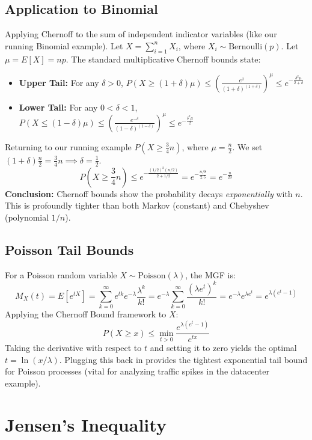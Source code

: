 \documentclass{article}
\begin{document}
\subsection{Application to Binomial}
Applying Chernoff to the sum of independent indicator variables (like our running Binomial example).
Let $X = \sum_{i=1}^n X_i$, where $X_i \sim \text{Bernoulli}(p)$. Let $\mu = E[X] = np$.
The standard multiplicative Chernoff bounds state:
\begin{itemize}
    \item \textbf{Upper Tail:} For any $\delta > 0$, $P(X \ge (1+\delta)\mu) \le \left( \frac{e^\delta}{(1+\delta)^{(1+\delta)}} \right)^\mu \le e^{-\frac{\delta^2 \mu}{2+\delta}}$
    \item \textbf{Lower Tail:} For any $0 < \delta < 1$, $P(X \le (1-\delta)\mu) \le \left( \frac{e^{-\delta}}{(1-\delta)^{(1-\delta)}} \right)^\mu \le e^{-\frac{\delta^2 \mu}{2}}$
\end{itemize}

Returning to our running example $P(X \ge \frac{3}{4}n)$, where $\mu = \frac{n}{2}$. We set $(1+\delta)\frac{n}{2} = \frac{3}{4}n \implies \delta = \frac{1}{2}$.
\[ P\left(X \ge \frac{3}{4}n\right) \le e^{-\frac{(1/2)^2 (n/2)}{2 + 1/2}} = e^{-\frac{n/8}{2.5}} = e^{-\frac{n}{20}} \]
\textbf{Conclusion:} Chernoff bounds show the probability decays \textit{exponentially} with $n$. This is profoundly tighter than both Markov (constant) and Chebyshev (polynomial $1/n$).

\subsection{Poisson Tail Bounds}
For a Poisson random variable $X \sim \text{Poisson}(\lambda)$, the MGF is:
\[ M_X(t) = E[e^{tX}] = \sum_{k=0}^{\infty} e^{tk} e^{-\lambda} \frac{\lambda^k}{k!} = e^{-\lambda} \sum_{k=0}^{\infty} \frac{(\lambda e^t)^k}{k!} = e^{-\lambda} e^{\lambda e^t} = e^{\lambda(e^t - 1)} \]
Applying the Chernoff Bound framework to $X$:
\[ P(X \ge x) \le \min_{t > 0} \frac{e^{\lambda(e^t - 1)}}{e^{tx}} \]
Taking the derivative with respect to $t$ and setting it to zero yields the optimal $t = \ln(x/\lambda)$. Plugging this back in provides the tightest exponential tail bound for Poisson processes (vital for analyzing traffic spikes in the datacenter example).

\section{Jensen's Inequality}
\end{document}
